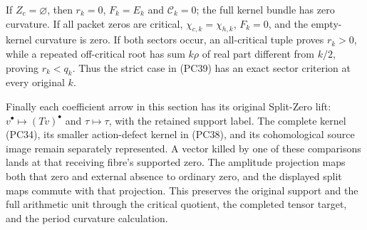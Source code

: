 If $Z_c=\varnothing$, then $r_k=0$, $F_k=E_k$ and
$\mathcal C_k=0$; the full kernel bundle has zero curvature.
If all packet zeros are critical, $\chi_{c,k}=\chi_{h,k}$,
$F_k=0$, and the empty-kernel curvature is zero.
If both sectors occur, an all-critical tuple proves $r_k>0$,
while a repeated off-critical root has sum $k\rho$ of real part
different from $k/2$, proving $r_k<q_k$.  Thus the strict case
in (PC39) has an exact sector criterion at every original $k$.

Finally each coefficient arrow in this section has its original
Split-Zero lift: $v^\bullet\mapsto(Tv)^\bullet$ and
$\tau\mapsto\tau$, with the retained support label.
The complete kernel (PC34), its smaller action-defect kernel in
(PC38), and its cohomological source image remain separately
represented.  A vector killed by one of these comparisons lands at
that receiving fibre's supported zero.  The amplitude projection
maps both that zero and external absence to ordinary zero, and the
displayed split maps commute with that projection.  This preserves
the original support and the full arithmetic unit through the
critical quotient, the completed tensor target, and the period
curvature calculation.


\endgroup
